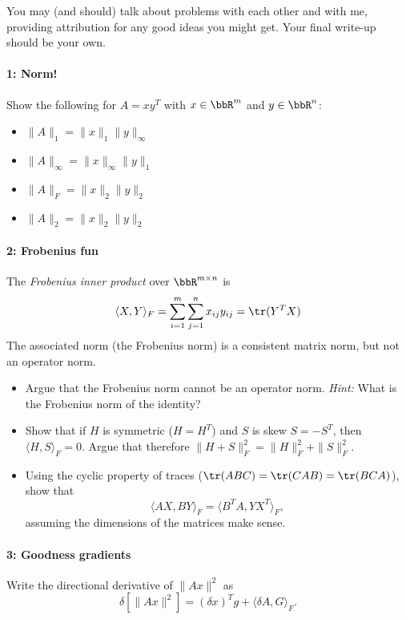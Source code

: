 \documentclass[12pt, leqno]{article} %
\begin{document}

You may (and should) talk about problems with each other and with me,
providing attribution for any good ideas you might get.  Your final
write-up should be your own.


\paragraph*{1: Norm!}
Show the following for $A = xy^T$ with $x \in \bbR^m$ and $y \in
\bbR^n$:
\begin{itemize}
\item $\|A\|_1 = \|x\|_1 \|y\|_\infty$
\item $\|A\|_\infty = \|x\|_\infty \|y\|_1$
\item $\|A\|_F = \|x\|_2 \|y\|_2$
\item $\|A\|_2 = \|x\|_2 \|y\|_2$
\end{itemize}

\paragraph*{2: Frobenius fun}
The {\em Frobenius inner product} over 
$\bbR^{m \times n}$ is
\[
  \langle X, Y \rangle_F
  = \sum_{i=1}^m \sum_{j=1}^n x_{ij} y_{ij}
  = \tr(Y^T X)
\]
The associated norm (the Frobenius norm) is a consistent matrix norm,
but not an operator norm.
\begin{itemize}
\item Argue that the Frobenius norm cannot be an operator norm.
  {\em Hint: } What is the Frobenius norm of the identity?
\item Show that if $H$ is symmetric ($H = H^T$) and $S$ is skew
  $S = -S^T$, then $\langle H, S \rangle_F = 0$.  Argue that therefore
  $\|H+S\|_F^2 = \|H\|_F^2 + \|S\|_F^2$.
\item Using the cyclic property of traces ($\tr(ABC) = \tr(CAB) =
  \tr(BCA)$), show that
  \[
    \langle AX, BY \rangle_F = \langle B^T A, YX^T \rangle_F,
  \]
  assuming the dimensions of the matrices make sense.
\end{itemize}

\paragraph*{3: Goodness gradients}
Write the directional derivative of $\|Ax\|^2$ as
\[
  \delta\left[ \|Ax\|^2 \right] = (\delta x)^T g + \langle \delta A, G \rangle_F.
\]
  
\end{document}
